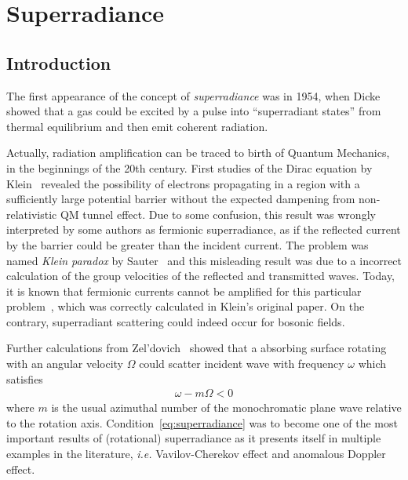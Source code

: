 
\chapter{Superradiance} %
\label{Chapter1} 


\section{Introduction}

The first appearance of the concept of \emph{superradiance} was in 1954, when Dicke~\cite{Dicke1954} showed that a gas could be excited by a pulse into ``superradiant states'' from thermal equilibrium and then emit coherent radiation. 

Actually, radiation amplification can be traced to birth of Quantum Mechanics, in the beginnings of the 20th century. 
First studies of the Dirac equation by Klein~\cite{Klein1929} revealed the possibility of electrons propagating in a region with a sufficiently large potential barrier without the expected dampening from non-relativistic QM tunnel effect.
Due to some confusion, this result was wrongly interpreted by some authors as fermionic superradiance, as if the reflected current by the barrier could be greater than the incident current. 
The problem was named \emph{Klein paradox} by Sauter~\cite{Sauter1931} and this misleading result was due to a incorrect calculation of the group velocities of the reflected and transmitted waves. 
Today, it is known that fermionic currents cannot be amplified for this particular problem~\cite{Manogue1988, Brito2015}, which was correctly calculated in Klein's original paper. 
On the contrary, superradiant scattering could indeed occur for bosonic fields. 

Further calculations from Zel'dovich~\cite{Zeldovich1971,Zeldovich1972} showed that a absorbing surface rotating with an angular velocity $\Omega$ could scatter incident wave with frequency $\omega$ which satisfies
\begin{align}
    \omega - m \Omega < 0
    \label{eq:superradiance}
\end{align}
where $m$ is the usual azimuthal number of the monochromatic plane wave relative to the rotation axis. 
Condition~\eqref{eq:superradiance} was to become one of the most important results of (rotational) superradiance as it presents itself in multiple examples in the literature, \emph{i.e.} Vavilov-Cherekov effect and anomalous Doppler effect.

